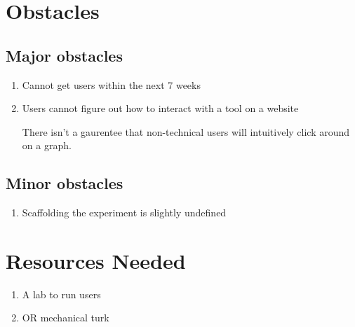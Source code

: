 \documentclass{proc}
\begin{document}
\section{Obstacles}

\subsection{Major obstacles} %

\begin{enumerate}
    \item Cannot get users within the next 7 weeks
    \item Users cannot figure out how to interact with a tool on a website

    There isn't a gaurentee that non-technical users will intuitively click around on a graph. 

\end{enumerate}

\subsection{Minor obstacles}

\begin{enumerate}
    \item Scaffolding the experiment is slightly undefined
\end{enumerate}

\section{Resources Needed}
\begin{enumerate}
    \item A lab to run users
    \item OR mechanical turk
\end{enumerate}
\end{document}
